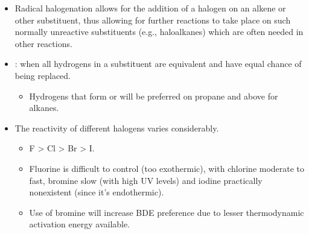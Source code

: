 \begin{itemize}
\begin{itemize}
      \end{itemize}
    \item Radical halogenation allows for the addition of a halogen on an alkene or other substituent, thus allowing for further reactions to take place on such normally unreactive substituents (e.g., haloalkanes) which are often needed in other reactions.
    \item {}: when all hydrogens in a substituent are equivalent and have equal chance of being replaced.
      \begin{itemize}
        \item Hydrogens that form  or  will be preferred on propane and above for alkanes.
      \end{itemize}
    \item The reactivity of different halogens varies considerably.
      \begin{itemize}
        \item F > Cl > Br > I.
        \item Fluorine is difficult to control (too exothermic), with chlorine moderate to fast, bromine slow (with high UV levels) and iodine practically nonexistent (since it's endothermic). 
        \item Use of bromine will increase BDE preference due to lesser thermodynamic activation energy available.
      \end{itemize}
\end{itemize}